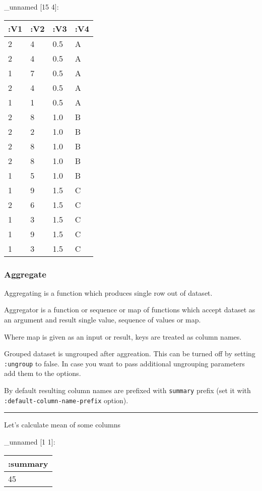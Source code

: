 \documentclass[]{article}
\newenvironment{Shaded}{\begin{snugshade}}{\end{snugshade}}
\newcommand{\AttributeTok}[1]{\textcolor[rgb]{0.77,0.63,0.00}{#1}}
\newcommand{\KeywordTok}[1]{\textcolor[rgb]{0.13,0.29,0.53}{\textbf{#1}}}
\newcommand{\NormalTok}[1]{#1}
\newcommand{\VariableTok}[1]{\textcolor[rgb]{0.00,0.00,0.00}{#1}}
\begin{document}
\_unnamed {[}15 4{]}:

\begin{longtable}[]{@{}llll@{}}
\toprule
:V1 & :V2 & :V3 & :V4\tabularnewline
\midrule
\endhead
2 & 4 & 0.5 & A\tabularnewline
2 & 4 & 0.5 & A\tabularnewline
1 & 7 & 0.5 & A\tabularnewline
2 & 4 & 0.5 & A\tabularnewline
1 & 1 & 0.5 & A\tabularnewline
2 & 8 & 1.0 & B\tabularnewline
2 & 2 & 1.0 & B\tabularnewline
2 & 8 & 1.0 & B\tabularnewline
2 & 8 & 1.0 & B\tabularnewline
1 & 5 & 1.0 & B\tabularnewline
1 & 9 & 1.5 & C\tabularnewline
2 & 6 & 1.5 & C\tabularnewline
1 & 3 & 1.5 & C\tabularnewline
1 & 9 & 1.5 & C\tabularnewline
1 & 3 & 1.5 & C\tabularnewline
\bottomrule
\end{longtable}

\hypertarget{aggregate}{%
\subsubsection{Aggregate}\label{aggregate}}

Aggregating is a function which produces single row out of dataset.

Aggregator is a function or sequence or map of functions which accept
dataset as an argument and result single value, sequence of values or
map.

Where map is given as an input or result, keys are treated as column
names.

Grouped dataset is ungrouped after aggreation. This can be turned off by
setting \texttt{:ungroup} to false. In case you want to pass additional
ungrouping parameters add them to the options.

By default resulting column names are prefixed with \texttt{summary}
prefix (set it with \texttt{:default-column-name-prefix} option).

\begin{center}\rule{0.5\linewidth}{0.5pt}\end{center}

Let's calculate mean of some columns

\begin{Shaded}
\end{Shaded}

\_unnamed {[}1 1{]}:

\begin{longtable}[]{@{}l@{}}
\toprule
:summary\tabularnewline
\midrule
\endhead
45\tabularnewline
\bottomrule
\end{longtable}
\end{document}
